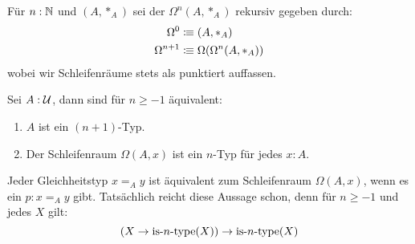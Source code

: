 \begin{definition}
  Für $n:\mathbb{N}$ und $(A,\ast_A)$ sei der  $\Omega^n(A,\ast_A)$ rekursiv gegeben durch:
  \begin{align*}
    \Omega^0&\vcentcolon\mspace{-1.2mu}\equiv (A,\ast_A) \\
    \Omega^{n+1}&\vcentcolon\mspace{-1.2mu}\equiv \Omega(\Omega^n(A,\ast_A))
  \end{align*}
  wobei wir Schleifenräume stets als punktiert auffassen.
\end{definition}

\begin{lemma}
  \label{lem:schleifenraum-n-typ}
  Sei $A:\mathcal{U}$, dann sind für $n\geq -1$ äquivalent:
  \begin{enumerate}[label=\roman*)]
  \item $A$ ist ein $(n+1)$-Typ.
  \item Der Schleifenraum $\Omega(A,x)$ ist ein $n$-Typ für jedes $x:A$.
  \end{enumerate}
\end{lemma}
\begin{beweis}[Idee]
  Jeder Gleichheitstyp $x=_A y$ ist äquivalent zum Schleifenraum $\Omega(A,x)$, wenn es ein $p:x=_A y$ gibt.
  Tatsächlich reicht diese Aussage schon, denn für $n\geq -1$ und jedes $X$ gilt:
  \[
    (X\to \mathrm{is}\mbox{-}{n}\mbox{-}\mathrm{type}(X))\to \mathrm{is}\mbox{-}{n}\mbox{-}\mathrm{type}(X)
  \]
\end{beweis}

